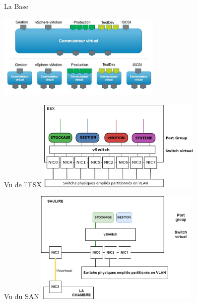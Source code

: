 \begin{frame}{La Base}
    \begin{center}
    \includegraphics[width=300px]{Schemas/Commu.jpg}
    \end{center}
\end{frame}

\begin{frame}{Vu de l'ESX}
\includegraphics[width=300px]{Schemas/VLAN.png}
\end{frame}

\begin{frame}{Vu du SAN}
\includegraphics[width=300px]{Schemas/VuDuSan.png}
\end{frame}
